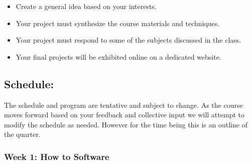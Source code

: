 \documentclass[10pt,letter,english]{article}
\begin{document}
\begin{itemize}
      \item
            Create a general idea based on your interests.
      \item
            Your project must synthesize the course materials and techniques.
      \item
            Your project must respond to some of the subjects discussed in the class.
      \item
            Your final projects will be exhibited online on a dedicated website.
\end{itemize}


\hypertarget{schedule}{%
      \subsection{Schedule:}\label{schedule}}

The schedule and program are tentative and subject to change. As the course moves forward based on your feedback and collective input we will attempt to modify the schedule as needed. However for the time being this is an outline of the quarter.

\hypertarget{week-1-how-to-software}{%
      \subsubsection{Week 1: How to Software}\label{week-1-how-to-software}}
\end{document}
